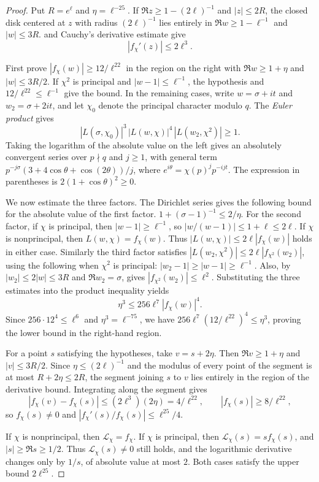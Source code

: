 \begin{proof}
Put $R=e^\ell$ and $\eta=\ell^{-25}$. If $\Re z\ge1-(2\ell)^{-1}$ and $|z|\le2R$, the closed disk centered at $z$ with radius $(2\ell)^{-1}$ lies entirely in
$\Re w\ge1-\ell^{-1}$ and $|w|\le3R$.  and Cauchy's derivative estimate give
\[
 |f_\chi'(z)|\le 2\ell^3.
\]

First prove $|f_\chi(w)|\ge12/\ell^{22}$ in the region on the right with $\Re w\ge1+\eta$ and $|w|\le 3R/2$.
If $\chi^2$ is principal and $|w-1|\le\ell^{-1}$, the hypothesis and $12/\ell^{22}\le\ell^{-1}$ give the bound.
In the remaining cases, write $w=\sigma+it$ and $w_2=\sigma+2it$, and let $\chi_0$ denote the principal character modulo $q$. The \emph{Euler product} gives
\[
 |L(\sigma,\chi_0)|^3\,|L(w,\chi)|^4\,|L(w_2,\chi^2)|\ge1.
\]
Taking the logarithm of the absolute value on the left gives an absolutely convergent series over $p\nmid q$ and $j\ge1$, with general term
$p^{-j\sigma}(3+4\cos\theta+\cos(2\theta))/j$, where
$e^{i\theta}=\chi(p)^j p^{-ijt}$. The expression in parentheses is $2(1+\cos\theta)^2\ge0$.

We now estimate the three factors. The Dirichlet series gives the following bound for the absolute value of the first factor.
$1+(\sigma-1)^{-1}\le2/\eta$.
For the second factor, if $\chi$ is principal, then $|w-1|\ge\ell^{-1}$, so
$|w/(w-1)|\le1+\ell\le2\ell$. If $\chi$ is nonprincipal, then $L(w,\chi)=f_\chi(w)$.
Thus $|L(w,\chi)|\le2\ell|f_\chi(w)|$ holds in either case.
Similarly the third factor satisfies $|L(w_2,\chi^2)|\le2\ell|f_{\chi^2}(w_2)|$, using the following when $\chi^2$ is principal:
$|w_2-1|\ge|w-1|\ge\ell^{-1}$. Also, by $|w_2|\le2|w|\le3R$ and $\Re w_2=\sigma$,  gives
$|f_{\chi^2}(w_2)|\le\ell^2$. Substituting the three estimates into the product inequality yields
\[
 \eta^3\le 256\ell^7 |f_\chi(w)|^4.
\]
Since $256\cdot12^4\le\ell^6$ and $\eta^3=\ell^{-75}$, we have
$256\ell^7(12/\ell^{22})^4\le\eta^3$, proving the lower bound in the right-hand region.

For a point $s$ satisfying the hypotheses, take $v=s+2\eta$. Then $\Re v\ge1+\eta$ and $|v|\le3R/2$.
Since $\eta\le(2\ell)^{-1}$ and the modulus of every point of the segment is at most $R+2\eta\le2R$, the segment joining $s$ to $v$ lies entirely in the region of the derivative bound. Integrating along the segment gives
\[
 |f_\chi(v)-f_\chi(s)|\le(2\ell^3)(2\eta)=4/\ell^{22},
 \qquad |f_\chi(s)|\ge 8/\ell^{22},
\]
so $f_\chi(s)\ne0$ and $|f_\chi'(s)/f_\chi(s)|\le\ell^{25}/4$.

If $\chi$ is nonprincipal, then $\mathcal L_\chi=f_\chi$. If $\chi$ is principal, then $\mathcal L_\chi(s)=s f_\chi(s)$, and $|s|\ge\Re s\ge1/2$. Thus $\mathcal L_\chi(s)\ne0$ still holds, and the logarithmic derivative changes only by $1/s$, of absolute value at most $2$. Both cases satisfy the upper bound $2\ell^{25}$.
\end{proof}

